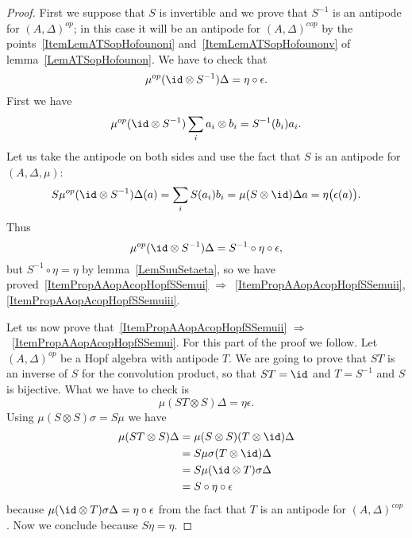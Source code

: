 \begin{proof}
	First we suppose that \( S\) is invertible and we prove that $S^{-1}$ is an antipode for \( (A,\Delta)^{op}\); in this case it will be an antipode for \( (A,\Delta)^{cop}\) by the points~\ref{ItemLemATSopHofounoni} and~\ref{ItemLemATSopHofounonv} of lemma~\ref{LemATSopHofounon}. We have to check that
	\begin{equation}
		\mu^{op}(\id\otimes S^{-1})\Delta=\eta\circ\epsilon.
	\end{equation}
	First we have
	\begin{equation}
		\mu^{op}(\id\otimes S^{-1})\sum_ia_i\otimes b_i=S^{-1}(b_i)a_i.
	\end{equation}
	Let us take the antipode on both sides and use the fact that \( S\) is an antipode for \( (A,\Delta,\mu)\):
	\begin{equation}
		S\mu^{op}(\id\otimes S^{-1})\Delta (a)=\sum_iS(a_i)b_i=\mu(S\otimes \id)\Delta a=\eta\big( \epsilon(a) \big).
	\end{equation}
	Thus
	\begin{equation}
		\mu^{op}(\id\otimes S^{-1})\Delta=S^{-1}\circ\eta\circ\epsilon,
	\end{equation}
	but \( S^{-1}\circ\eta=\eta\) by lemma~\ref{LemSuuSetaeta}, so we have proved~\ref{ItemPropAAopAcopHopfSSemui} \( \Rightarrow\)~\ref{ItemPropAAopAcopHopfSSemuii},\ref{ItemPropAAopAcopHopfSSemuiii}.

	Let us now prove that~\ref{ItemPropAAopAcopHopfSSemuii} \( \Rightarrow\)~\ref{ItemPropAAopAcopHopfSSemui}. For this part of the proof we follow\cite{RolandVertignioux}. Let \( (A,\Delta)^{op}\) be a Hopf algebra with antipode \( T\). We are going to prove that \( ST\) is an inverse of \( S\) for the convolution product, so that \( ST=\id\) and \( T=S^{-1}\) and \( S\) is bijective. What we have to check is
	\begin{equation}
		\mu(ST\otimes S)\Delta=\eta\epsilon.
	\end{equation}
	Using \( \mu(S\otimes S)\sigma=S\mu\) we have
	\begin{equation}
		\begin{aligned}[]
			\mu(ST\otimes S)\Delta & =\mu(S\otimes S)(T\otimes \id)\Delta \\
			                       & =S\mu\sigma(T\otimes \id)\Delta      \\
			                       & =S\mu(\id\otimes T)\sigma\Delta      \\
			                       & =S\circ\eta\circ\epsilon
		\end{aligned}
	\end{equation}
	because \( \mu(\id\otimes T)\sigma\Delta=\eta\circ\epsilon\) from the fact that \( T\) is an antipode for \( (A,\Delta)^{cop}\). Now we conclude because \( S\eta=\eta\).
\end{proof}


